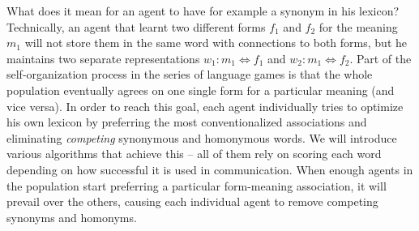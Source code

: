 What does it mean for an agent to have for example a synonym in his
lexicon? Technically, an agent that learnt two different forms $f_1$
and $f_2$ for the meaning $m_1$ will not store them in the same word
with connections to both forms, but he maintains two separate
representations $w_1: m_1 \Leftrightarrow f_1$ and $w_2: m_1
\Leftrightarrow f_2$. Part of the self-organization process in the
series of language games is that the whole population eventually
agrees on one single form for a particular meaning (and vice
versa). In order to reach this goal, each agent individually tries to
optimize his own lexicon by preferring the most conventionalized
associations and eliminating \emph{competing} synonymous and
homonymous words. We will introduce various algorithms that achieve
this -- all of them rely on scoring each word depending on how
successful it is used in communication. When enough agents in the
population start preferring a particular form-meaning association, it
will prevail over the others, causing each individual agent to remove
competing synonyms and homonyms.

